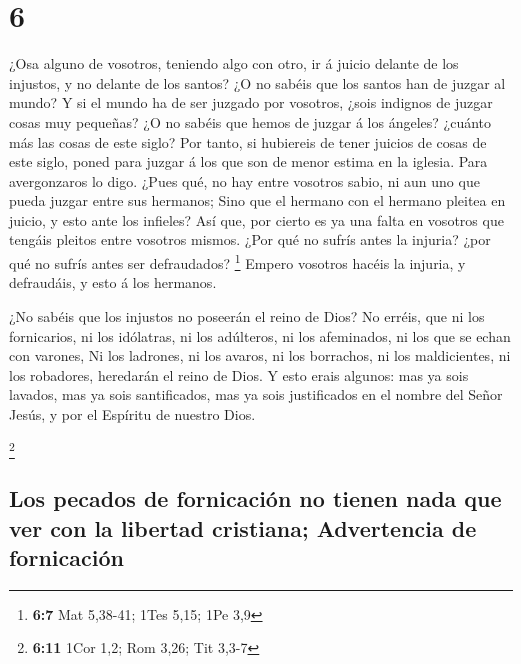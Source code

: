 \hypertarget{section-5}{%
\section{6}\label{section-5}}

 ¿Osa alguno de vosotros, teniendo algo con otro, ir á
juicio delante de los injustos, y no delante de los santos?
 ¿O no sabéis que los santos han de juzgar al mundo? Y si
el mundo ha de ser juzgado por vosotros, ¿sois indignos de juzgar cosas
muy pequeñas?  ¿O no sabéis que hemos de juzgar á los
ángeles? ¿cuánto más las cosas de este siglo?  Por tanto,
si hubiereis de tener juicios de cosas de este siglo, poned para juzgar
á los que son de menor estima en la iglesia.  Para
avergonzaros lo digo. ¿Pues qué, no hay entre vosotros sabio, ni aun uno
que pueda juzgar entre sus hermanos;  Sino que el hermano
con el hermano pleitea en juicio, y esto ante los infieles?
 Así que, por cierto es ya una falta en vosotros que
tengáis pleitos entre vosotros mismos. ¿Por qué no sufrís antes la
injuria? ¿por qué no sufrís antes ser defraudados? \footnote{\textbf{6:7}
  Mat 5,38-41; 1Tes 5,15; 1Pe 3,9}  Empero vosotros hacéis
la injuria, y defraudáis, y esto á los hermanos.

 ¿No sabéis que los injustos no poseerán el reino de Dios?
No erréis, que ni los fornicarios, ni los idólatras, ni los adúlteros,
ni los afeminados, ni los que se echan con varones,  Ni
los ladrones, ni los avaros, ni los borrachos, ni los maldicientes, ni
los robadores, heredarán el reino de Dios.  Y esto erais
algunos: mas ya sois lavados, mas ya sois santificados, mas ya sois
justificados en el nombre del Señor Jesús, y por el Espíritu de nuestro
Dios.

\footnote{\textbf{6:11} 1Cor 1,2; Rom 3,26; Tit 3,3-7}

\hypertarget{los-pecados-de-fornicaciuxf3n-no-tienen-nada-que-ver-con-la-libertad-cristiana-advertencia-de-fornicaciuxf3n}{%
\subsection{Los pecados de fornicación no tienen nada que ver con la
libertad cristiana; Advertencia de
fornicación}\label{los-pecados-de-fornicaciuxf3n-no-tienen-nada-que-ver-con-la-libertad-cristiana-advertencia-de-fornicaciuxf3n}}

